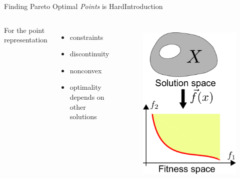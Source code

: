 \begin{frame}{Finding Pareto Optimal {\em Points} is Hard}{Introduction}
\begin{columns}
For the point representation
\begin{itemize}
\item \textcolor{diff-path}{constraints}
\item \textcolor{diff-path}{discontinuity}
\item \textcolor{diff-path}{nonconvex}
\item \textcolor{diff-path}{optimality depends on other solutions}
\end{itemize}
	\begin{figure}
		\centering
		\includegraphics[width=\linewidth]{figure/MOO_point}
		\label{fig:point_solution_space}
	\end{figure}
\end{columns}
\end{frame}

